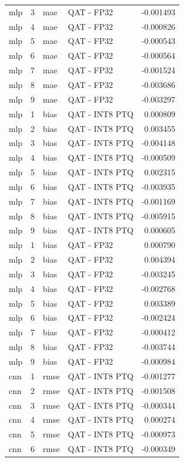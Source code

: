 \begin{tabular}{lrllr}
mlp & 3 & mae & QAT - FP32 & -0.001493 \\
mlp & 4 & mae & QAT - FP32 & -0.000826 \\
mlp & 5 & mae & QAT - FP32 & -0.000543 \\
mlp & 6 & mae & QAT - FP32 & -0.000564 \\
mlp & 7 & mae & QAT - FP32 & -0.001524 \\
mlp & 8 & mae & QAT - FP32 & -0.003686 \\
mlp & 9 & mae & QAT - FP32 & -0.003297 \\
mlp & 1 & bias & QAT - INT8 PTQ & 0.000809 \\
mlp & 2 & bias & QAT - INT8 PTQ & 0.003455 \\
mlp & 3 & bias & QAT - INT8 PTQ & -0.004148 \\
mlp & 4 & bias & QAT - INT8 PTQ & -0.000509 \\
mlp & 5 & bias & QAT - INT8 PTQ & 0.002315 \\
mlp & 6 & bias & QAT - INT8 PTQ & -0.003935 \\
mlp & 7 & bias & QAT - INT8 PTQ & -0.001169 \\
mlp & 8 & bias & QAT - INT8 PTQ & -0.005915 \\
mlp & 9 & bias & QAT - INT8 PTQ & 0.000605 \\
mlp & 1 & bias & QAT - FP32 & 0.000790 \\
mlp & 2 & bias & QAT - FP32 & 0.004394 \\
mlp & 3 & bias & QAT - FP32 & -0.003245 \\
mlp & 4 & bias & QAT - FP32 & -0.002768 \\
mlp & 5 & bias & QAT - FP32 & 0.003389 \\
mlp & 6 & bias & QAT - FP32 & -0.002424 \\
mlp & 7 & bias & QAT - FP32 & -0.000412 \\
mlp & 8 & bias & QAT - FP32 & -0.003744 \\
mlp & 9 & bias & QAT - FP32 & -0.000984 \\
cnn & 1 & rmse & QAT - INT8 PTQ & -0.001277 \\
cnn & 2 & rmse & QAT - INT8 PTQ & -0.001508 \\
cnn & 3 & rmse & QAT - INT8 PTQ & -0.000344 \\
cnn & 4 & rmse & QAT - INT8 PTQ & 0.000274 \\
cnn & 5 & rmse & QAT - INT8 PTQ & -0.000973 \\
cnn & 6 & rmse & QAT - INT8 PTQ & -0.000349 \\

\end{tabular}
